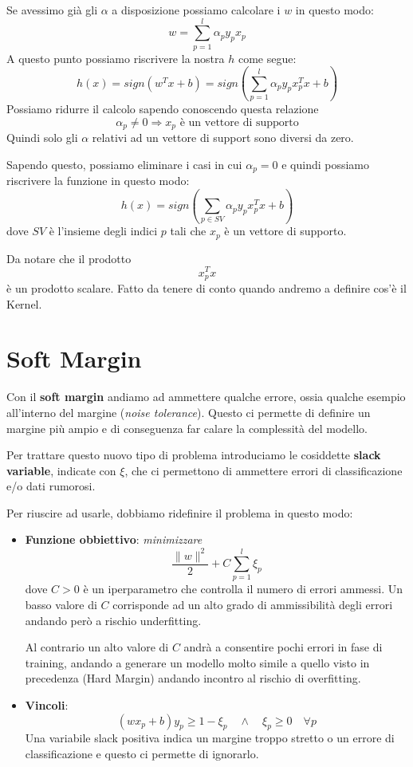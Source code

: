 Se avessimo gi\`a gli $\alpha$ a disposizione possiamo calcolare i $w$ in questo modo:
\[ w = \sum_{p=1}^l \alpha_p y_p x_p \]
A questo punto possiamo riscrivere la nostra $h$ come segue:
\[ h(x) = sign(w^T x + b) = sign \left( \sum_{p=1}^l \alpha_p y_p x_p^T x + b \right) \]
Possiamo ridurre il calcolo sapendo conoscendo questa relazione
\[ \alpha_p \neq 0 \Rightarrow x_p \text{ \`e un vettore di supporto} \]
Quindi solo gli $\alpha$ relativi ad un vettore di support sono diversi da zero.

Sapendo questo, possiamo eliminare i casi in cui $\alpha_p = 0$ e quindi possiamo riscrivere la funzione in questo modo:
\[ h(x) = sign \left( \sum_{p \in SV} \alpha_p y_p x_p^T x + b \right) \]
dove $SV$ \`e l'insieme degli indici $p$ tali che $x_p$ \`e un vettore di supporto.

Da notare che il prodotto
\[ x_p^T x \]
\`e un prodotto scalare. Fatto da tenere di conto quando andremo a definire cos'\`e il Kernel.

\section{Soft Margin}
Con il \textbf{soft margin} andiamo ad ammettere qualche errore, ossia qualche esempio all'interno del margine
(\emph{noise tolerance}). Questo ci permette di definire un margine pi\`u ampio e di conseguenza far calare la complessit\`a
del modello.

Per trattare questo nuovo tipo di problema introduciamo le cosiddette \textbf{slack variable}, indicate con $\xi$, che ci
permettono di ammettere errori di classificazione e/o dati rumorosi.

Per riuscire ad usarle, dobbiamo ridefinire il problema in questo modo:
\begin{itemize}
	\item \textbf{Funzione obbiettivo}: \emph{minimizzare}
	      \[ \frac{\| w \|^2}{2} + C \sum_{p=1}^l \xi_p \]
	      dove $C > 0$ \`e un iperparametro che controlla il numero di errori ammessi. Un basso valore di $C$ corrisponde
	      ad un alto grado di ammissibilit\`a degli errori andando per\`o a rischio underfitting.

	      Al contrario un alto valore di $C$ andr\`a a consentire pochi errori in fase di training, andando a generare un
	      modello molto simile a quello visto in precedenza (Hard Margin) andando incontro al rischio di overfitting.
	\item \textbf{Vincoli}:
	      \[ (w x_p + b) y_p \geq 1 - \xi_p \quad \wedge \quad \xi_p \geq 0 \quad \forall p \]
	      Una variabile slack positiva indica un margine troppo stretto o un errore di classificazione e questo ci permette
	      di ignorarlo.
\end{itemize}

